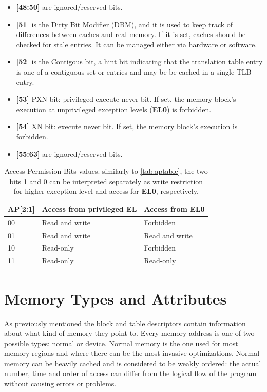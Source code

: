 \documentclass[12pt,a4paper,openright,twoside]{report}
\begin{document}
\begin{itemize}
    \item \textbf{[48:50]} are ignored/reserved bits.
    \item \textbf{[51]} is the Dirty Bit Modifier (DBM), and it is used to keep
        track of differences between caches and real memory. If it is set, caches
        should be checked for stale entries. It can be managed either via 
        hardware or software.
    \item \textbf{[52]} is the Contigous bit, a hint bit indicating that the 
        translation table entry is one of a contiguous set or entries and may be
        be cached in a single TLB entry.
    \item \textbf{[53]} PXN bit: privileged execute never bit. If set, the memory block's 
        execution at unprivileged exception levels (\textbf{EL0}) is forbidden.
    \item \textbf{[54]} XN bit: execute never bit. If set, the memory block's 
        execution is forbidden.
    \item \textbf{[55:63]} are ignored/reserved bits.
\end{itemize}

\begin{table}[]
    \begin{center}
    \begin{tabular}{|l|l|l|}
    \hline
    \rowcolor[HTML]{9B9B9B} 
    AP{[}2:1{]} & Access from privileged EL & Access from EL0 \\ \hline
    00          & Read and write            & Forbidden       \\ \hline
    01          & Read and write            & Read and write  \\ \hline
    10          & Read-only                 & Forbidden       \\ \hline
    11          & Read-only                 & Read-only       \\ \hline
    \end{tabular}
    \caption[APBits]{Access Permission Bits values. similarly to \ref{tab:aptable},
    the two bits 1 and 0 can be interpreted separately as write restriction for higher
    exception level and access for \textbf{EL0}, respectively.}
    \label{tab:apbits}
\end{center}
    \end{table}



\section{Memory Types and Attributes}
\label{mair}
As previously mentioned the block and table descriptors contain information about
what kind of memory they point to.
Every memory address is one of two possible types: normal or device.
Normal memory is the one used for most memory regions and where there can be 
the most invasive optimizations. Normal memory can be heavily cached and is 
considered to be weakly ordered: the actual number, time and order of access can 
differ from the logical flow of the program without causing errors or problems.
\end{document}
